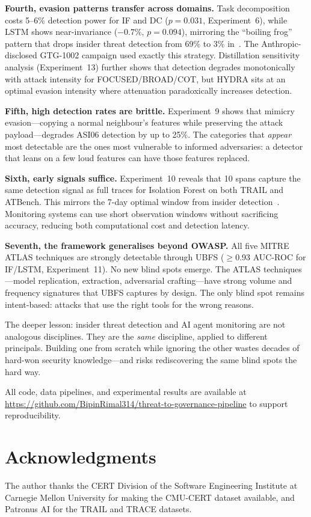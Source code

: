 \documentclass[conference]{IEEEtran}
\begin{document}
\textbf{Fourth, evasion patterns transfer across domains.} Task decomposition costs 5--6\% detection power for IF and DC ($p{=}0.031$, Experiment~6), while LSTM shows near-invariance ($-0.7\%$, $p{=}0.094$), mirroring the ``boiling frog'' pattern that drops insider threat detection from 69\% to 3\% in~\cite{rimal2026insider}. The Anthropic-disclosed GTG-1002 campaign used exactly this strategy. Distillation sensitivity analysis (Experiment~13) further shows that detection degrades monotonically with attack intensity for FOCUSED/BROAD/COT, but HYDRA sits at an optimal evasion intensity where attenuation paradoxically increases detection.

\textbf{Fifth, high detection rates are brittle.} Experiment~9 shows that mimicry evasion---copying a normal neighbour's features while preserving the attack payload---degrades ASI06 detection by up to 25\%. The categories that \textit{appear} most detectable are the ones most vulnerable to informed adversaries: a detector that leans on a few loud features can have those features replaced.

\textbf{Sixth, early signals suffice.} Experiment~10 reveals that 10 spans capture the same detection signal as full traces for Isolation Forest on both TRAIL and ATBench. This mirrors the 7-day optimal window from insider detection~\cite{rimal2026insider}. Monitoring systems can use short observation windows without sacrificing accuracy, reducing both computational cost and detection latency.

\textbf{Seventh, the framework generalises beyond OWASP.} All five MITRE ATLAS techniques are strongly detectable through UBFS (${\geq}$0.93 AUC-ROC for IF/LSTM, Experiment~11). No new blind spots emerge. The ATLAS techniques---model replication, extraction, adversarial crafting---have strong volume and frequency signatures that UBFS captures by design. The only blind spot remains intent-based: attacks that use the right tools for the wrong reasons.

The deeper lesson: insider threat detection and AI agent monitoring are not analogous disciplines. They are the \textit{same} discipline, applied to different principals. Building one from scratch while ignoring the other wastes decades of hard-won security knowledge---and risks rediscovering the same blind spots the hard way.

All code, data pipelines, and experimental results are available at \url{https://github.com/BipinRimal314/threat-to-governance-pipeline} to support reproducibility.

\section*{Acknowledgments}

The author thanks the CERT Division of the Software Engineering Institute at Carnegie Mellon University for making the CMU-CERT dataset available, and Patronus AI for the TRAIL and TRACE datasets.



\end{document}
